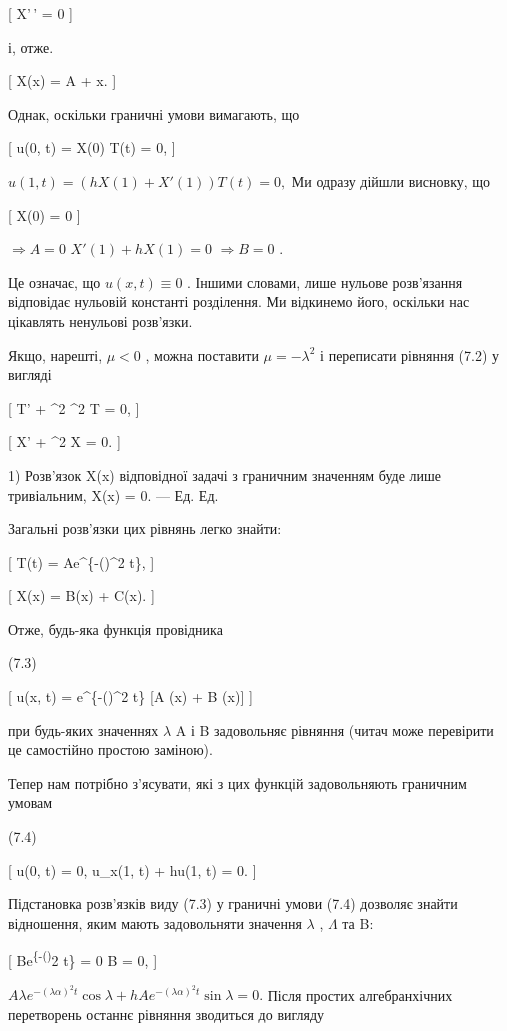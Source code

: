 \documentclass[
  ukrainian,
]{article}
\begin{document}
{[} X'\,' = 0 {]}

і, отже.

{[} X(x) = A + x. {]}

Однак, оскільки граничні умови вимагають, що

{[} u(0, t) = X(0) T(t) = 0, {]}

\(u(1, t) = (hX(1) + X'(1)) T(t) = 0,\) Ми одразу дійшли висновку, що

{[} X(0) = 0 {]}

\(\Rightarrow A = 0\) \(X'(1) + hX(1) = 0\) \(\Rightarrow B = 0\) .

Це означає, що \(u(x, t) \equiv 0\) . Іншими словами, лише нульове
розв'язання відповідає нульовій константі розділення. Ми відкинемо його,
оскільки нас цікавлять ненульові розв'язки.

Якщо, нарешті, \(\mu < 0\) , можна поставити \(\mu = -\lambda^2\) і
переписати рівняння (7.2) у вигляді

{[} T' + \lambda\^{}2 \alpha\^{}2 T = 0, {]}

{[} X' + \lambda\^{}2 X = 0. {]}

1) Розв'язок X(x) відповідної задачі з граничним значенням буде лише
тривіальним, X(x) = 0. --- Ед. Ед.

Загальні розв'язки цих рівнянь легко знайти:

{[} T(t) = Ae\^{}\{-(\lambda \alpha)\^{}2 t\}, {]}

{[} X(x) = B\sin(\lambda x) + C\cos(\lambda x). {]}

Отже, будь-яка функція провідника

(7.3)

{[} u(x, t) = e\^{}\{-(\lambda \alpha)\^{}2 t\} {[}A \sin(\lambda x) + B
\cos(\lambda x){]} {]}

при будь-яких значеннях \(\lambda\) A і B задовольняє рівняння (читач
може перевірити це самостійно простою заміною).

Тепер нам потрібно з'ясувати, які з цих функцій задовольняють граничним
умовам

(7.4)

{[} u(0, t) = 0, u\_x(1, t) + hu(1, t) = 0. {]}

Підстановка розв'язків виду (7.3) у граничні умови (7.4) дозволяє знайти
відношення, яким мають задовольняти значення \(\lambda\) , \(\Lambda\)
та B:

{[} Be\textsuperscript{\{-(\lambda\alpha)}2 t\} = 0 \Rightarrow B = 0,
{]}

\(A\lambda e^{-(\lambda\alpha)^2 t} \cos \lambda + hAe^{-(\lambda\alpha)^2 t} \sin \lambda = 0.\)
Після простих алгебранхічних перетворень останнє рівняння зводиться до
вигляду
\end{document}
